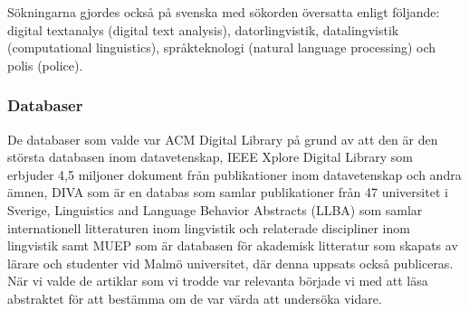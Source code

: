 \documentclass[swedish]{maucsthesis}
\begin{document}
Sökningarna gjordes också på svenska med sökorden översatta enligt följande:
digital textanalys (digital text analysis), datorlingvistik, datalingvistik
(computational linguistics), språkteknologi (natural language processing) och
polis (police).

\subsubsection{Databaser}

De databaser som valde var ACM Digital Library på grund av att den är den
största databasen inom datavetenskap, IEEE Xplore Digital Library som erbjuder
4,5 miljoner dokument från publikationer inom datavetenskap och andra ämnen,
DIVA som är en databas som samlar publikationer från 47 universitet i Sverige,
Linguistics and Language Behavior Abstracts (LLBA) som samlar internationell
litteraturen inom lingvistik och relaterade discipliner inom lingvistik samt
MUEP som är databasen för akademisk litteratur som skapats av lärare och
studenter vid Malmö universitet, där denna uppsats också publiceras. När vi
valde de artiklar som vi trodde var relevanta började vi med att läsa abstraktet
för att bestämma om de var värda att undersöka vidare.
\end{document}
